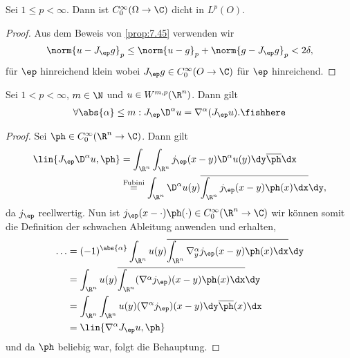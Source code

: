\begin{cor}
\label{cor:7.49}
Sei $1\le p < \infty$. Dann ist $C_0^\infty(\Omega\to\C)$
dicht in $L^p(O)$.\fishhere
\end{cor}
\begin{proof}
Aus dem Beweis von \ref{prop:7.45} verwenden wir
\begin{align*}
\norm{u-J_\ep g}_p \le \norm{u-g}_p + \norm{g-J_\ep g}_p  < 2\delta,
\end{align*}
für $\ep$ hinreichend klein wobei $J_\ep g\in C_0^\infty(O\to\C)$ für $\ep$
hinreichend.\qedhere
\end{proof}

\begin{prop}
\label{prop:7.50}
Sei $1<p<\infty$, $m\in\N$ und $u\in W^{m,p}(\R^n)$. Dann gilt
\begin{align*}
\forall \abs{\alpha} \le m : J_\ep\D^\alpha u = \nabla^\alpha (J_\ep
u).\fishhere
\end{align*}
\end{prop}
\begin{proof}
Sei $\ph\in C_0^\infty(\R^n\to\C)$. Dann gilt
\begin{align*}
\lin{J_\ep \D^\alpha u,\ph}
&= \int_{\R^n}\int_{\R^n} j_\ep(x-y)\D^\alpha u(y) \dy 
\overline{\ph}\dx\\
&\overset{\text{Fubini}}
{=} \int_{\R^n}\D^\alpha u(y)\overline{\int_{\R^n} j_\ep(x-y)\ph(x)\dx} \dy,
\end{align*}
da $j_\ep$ reellwertig. Nun ist $j_\ep(x-\cdot)\ph(\cdot)\in
C_0^\infty(\R^n\to\C)$ wir können somit die Definition der schwachen Ableitung
anwenden und erhalten,
\begin{align*}
\ldots &=
(-1)^{\abs{\alpha}} \int_{\R^n}u(y) \overline{\int_{\R^n}
\nabla^\alpha_y j_\ep(x-y)\ph(x)\dx}
\dy \\ &=
\int_{\R^n}u(y) \overline{\int_{\R^n}
(\nabla^\alpha j_\ep)(x-y)\ph(x)\dx}
\dy\\
&=
\int_{\R^n} \int_{\R^n}
u(y)
(\nabla^\alpha j_\ep)(x-y)\dy\overline{\ph}(x)
\dx\\
&=
\lin{\nabla^\alpha J_\ep u,\ph}
\end{align*}
und da $\ph$ beliebig war, folgt die Behauptung.\qedhere
\end{proof}

